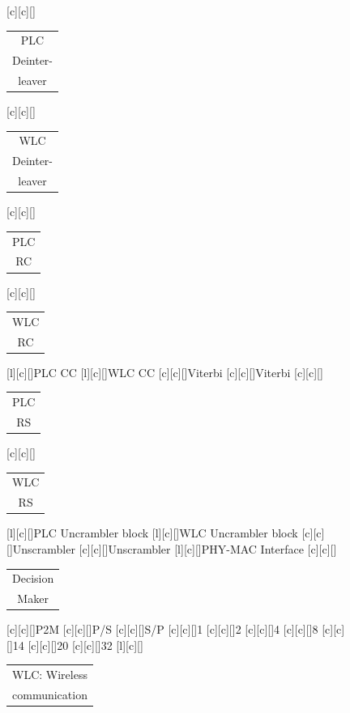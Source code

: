 \documentclass[mathserif]{beamer}
\begin{document}
\begin{frame}
\begin{overprint}
{\begin{figure}[htb]
				[c][c][\sizeLetter]{\begin{tabular}{c}
						PLC\\Deinter-\\leaver
				\end{tabular}}
				[c][c][\sizeLetter]{\begin{tabular}{c}
						WLC\\Deinter-\\leaver
				\end{tabular}}
				[c][c][\sizeLetter]{\begin{tabular}{c}
						PLC\\RC
				\end{tabular}}
				[c][c][\sizeLetter]{\begin{tabular}{c}
						WLC\\RC
				\end{tabular}}
				[l][c][\sizeLetter]{PLC CC}
				[l][c][\sizeLetter]{WLC CC}
				[c][c][\sizeLetter]{Viterbi}
				[c][c][\sizeLetter]{Viterbi}
				[c][c][\sizeLetter]{\begin{tabular}{c}
						PLC\\RS
				\end{tabular}}
				[c][c][\sizeLetter]{\begin{tabular}{c}
						WLC\\RS
				\end{tabular}}
				[l][c][\sizeLetter]{PLC Uncrambler block}
				[l][c][\sizeLetter]{WLC Uncrambler block}
				[c][c][\sizeLetter]{Unscrambler}
				[c][c][\sizeLetter]{Unscrambler}
				[l][c][\sizeLetter]{PHY-MAC Interface}
				[c][c][\sizeLetter]{\begin{tabular}{c}
						Decision\\Maker
				\end{tabular}}
				[c][c][\sizeLetter]{P2M}
				[c][c][\sizeLetter]{P/S}
				[c][c][\sizeLetter]{S/P}
				[c][c][\sizeLetter]{1}	
				[c][c][\sizeLetter]{2}	
				[c][c][\sizeLetter]{4}	
				[c][c][\sizeLetter]{8}	
				[c][c][\sizeLetter]{14}
				[c][c][\sizeLetter]{20}	
				[c][c][\sizeLetter]{32}	
				[l][c][\sizeLetter]{\begin{tabular}{c}
						WLC: Wireless\\communication
				\end{tabular}}	

\end{figure}}
\end{overprint}
\end{frame}
\end{document}
